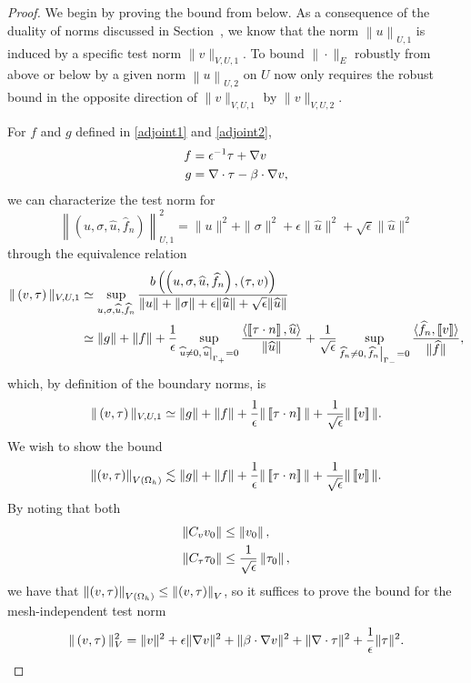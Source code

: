 \begin{proof}
We begin by proving the bound from below. As a consequence of the duality of norms discussed in Section~, we know that the norm $\left\| u \right\|_{U,1}$ is induced by a specific test norm $\| v  \|_{V,U,1}$.  To bound $\|\cdot\|_E$ robustly from above or below by a given norm $\left\| u \right\|_{U,2}$ on $U$ now only requires the robust bound in the opposite direction of $\| v \|_{V,U,1}$ by $\|v\|_{V,U,2}$. 

For $f$ and $g$ defined in \eqref{adjoint1} and \eqref{adjoint2},
\begin{align*}
f &= \epsilon^{-1}\tau + \grad v  \\
g &=\div \tau - \beta\cdot \grad v,
\end{align*} 
we can characterize the test norm for 
\[
\left\|\left(u,\sigma,\widehat{u},\widehat{f}_n\right)\right\|_{U,1}^2 = \|u\|^2 + \|\sigma\|^2 + \epsilon\|\widehat{u}\|^2+ \sqrt{\epsilon}\|\widehat{u}\|^2
\]
through the equivalence relation
\begin{align*}
\|\left(v,\tau\right)\|_{V,U,1} &\simeq \sup_{u,\sigma,\widehat{u},\widehat{f}_n}\frac{b\left(\left(u,\sigma,\widehat{u},\widehat{f}_n\right),\left(\tau,v\right)\right)}{\|u\| + \|\sigma\| + \epsilon\|\widehat{u}\|+ \sqrt{\epsilon}\|\widehat{u}\|}\\
& \simeq \|g\| + \|f\| + \frac{1}{\epsilon}\sup_{\widehat{u}\neq 0, \left.\widehat{u}\right|_{\Gamma_+} = 0} \frac{\langle \jump{\tau\cdot n}, \widehat{u}\rangle}{\|\widehat{u}\|} + \frac{1}{\sqrt{\epsilon}}\sup_{\widehat{f}_n\neq 0, \left.\widehat{f}_n\right|_{\Gamma_-}=0}\frac{\langle \widehat{f}_n, \jump{v}\rangle}{\|\widehat{f}\|},
\end{align*}
which, by definition of the boundary norms, is 
\[
\|\left(v,\tau\right)\|_{V,U,1} \simeq \|g\| + \|f\| + \frac{1}{\epsilon}\|\jump{\tau\cdot n}\| + \frac{1}{\sqrt{\epsilon}}\|\jump{v}\|.
\]
We wish to show the bound
\[
\nor{\left(v,\tau\right)}_{V(\Oh)} \lesssim \|g\| + \|f\| + \frac{1}{\epsilon}\|\jump{\tau\cdot n}\| + \frac{1}{\sqrt{\epsilon}}\|\jump{v}\|.
\]
By noting that both 
\begin{align*}
\nor{C_vv_0} &\leq \nor{v_0},\\
\nor{C_\tau\tau_0} &\leq \frac{1}{\sqrt{\epsilon}}\nor{\tau_0},
\end{align*}
we have that $\nor{\left(v,\tau\right)}_{V(\Oh)} \leq \nor{\left(v,\tau\right)}_{V}$, so it suffices to prove the bound for the mesh-independent test norm 
\[
\|\left(v,\tau\right)\|_{V}^2 = \|v\|^2 + \epsilon \|\grad v\|^2 + \|\beta \cdot \grad v\|^2 + \| \div \tau\|^2 + \frac{1}{\epsilon}\|\tau\|^2.
\]


\end{proof}
